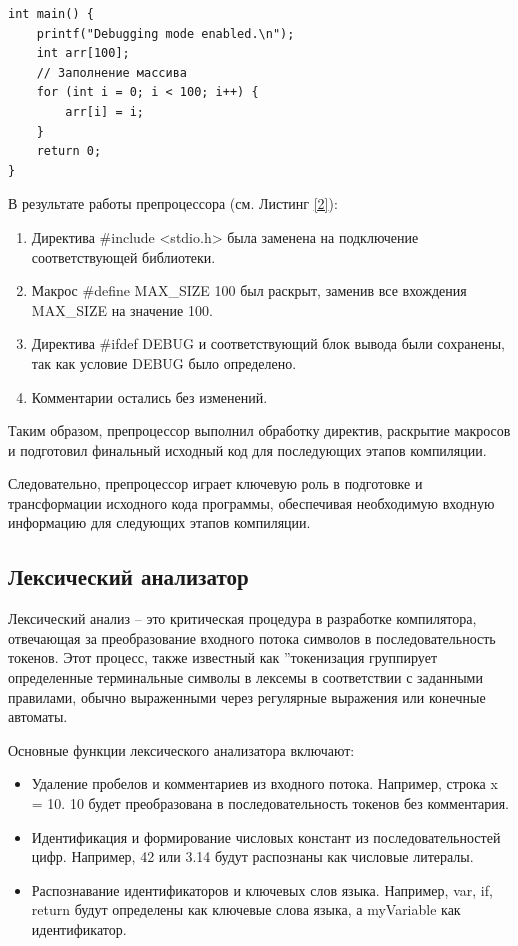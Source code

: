 \begin{lstlisting}[label = 2, caption=После препроцессинга]
    int main() {
    printf("Debugging mode enabled.\n");
    int arr[100];
    // Заполнение массива
    for (int i = 0; i < 100; i++) {
        arr[i] = i;
    }
    return 0;
}
\end{lstlisting}

В результате работы препроцессора (см. Листинг \ref{2}):
\begin{enumerate}
    \item Директива \#include <stdio.h> была заменена на подключение соответствующей библиотеки.
    \item Макрос \#define MAX\_SIZE 100 был раскрыт, заменив все вхождения MAX\_SIZE на значение 100.
    \item Директива \#ifdef DEBUG и соответствующий блок вывода были сохранены, так как условие DEBUG было определено.
    \item Комментарии остались без изменений.
\end{enumerate}
Таким образом, препроцессор выполнил обработку директив, раскрытие макросов и подготовил финальный исходный код для последующих этапов компиляции.

Следовательно, препроцессор играет ключевую роль в подготовке и трансформации исходного кода программы, обеспечивая необходимую входную информацию для следующих этапов компиляции.

\subsection{Лексический анализатор}
Лексический анализ – это критическая процедура в разработке компилятора, отвечающая за преобразование входного потока символов в последовательность токенов. Этот процесс, также известный как ”токенизация группирует определенные терминальные символы в лексемы в соответствии с заданными правилами, обычно выраженными через регулярные выражения или конечные автоматы.

Основные функции лексического анализатора включают:
\begin{itemize}
    \item Удаление пробелов и комментариев из входного потока. Например, строка x = 10. 10 будет преобразована в последовательность токенов без комментария.
    \item Идентификация и формирование числовых констант из последовательностей цифр. Например, 42 или 3.14 будут распознаны как числовые литералы.
    \item Распознавание идентификаторов и ключевых слов языка. Например, var, if, return будут определены как ключевые слова языка, а myVariable как идентификатор.
\end{itemize}

